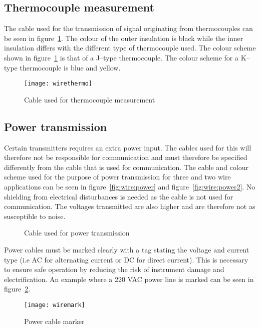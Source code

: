 \subsection{Thermocouple measurement}
The cable used for the transmission of signal originating from thermocouples can be seen in figure~\ref{fig:wire:thermo}. The colour of the outer insulation is black while the inner insulation differs with the different type of thermocouple used. The colour scheme shown in figure~\ref{fig:wire:thermo} is that of a J--type thermocouple. The colour scheme for a K--type thermocouple is blue and yellow.
\begin{figure}[htbp]
	\centering
	\texttt{[image: wirethermo]}
	\caption{Cable used for thermocouple measurement}
	\label{fig:wire:thermo}
\end{figure}

\subsection{Power transmission}
Certain transmitters requires an extra power input. The cables used for this will therefore not be responsible for communication and must therefore be specified differently from the cable that is used for communication. The cable and colour scheme used for the purpose of power transmission for three  and two wire applications can be seen in figure~\ref{fig:wire:power} and figure~\ref{fig:wire:power2}. No shielding from electrical disturbances is needed as the cable is not used for communication. The voltages transmitted are also higher and are therefore not as susceptible to noise.
\begin{figure}[htbp]
  \centering
 	\caption{Cable used for power transmission}
\end{figure}     

Power cables must be marked clearly with a tag stating the voltage and current type (i.e AC for alternating current or DC for direct current). This is necessary to ensure safe operation by reducing the risk of instrument damage and electrification. An example where a 220 VAC power line is marked can be seen in figure~\ref{fig:wire:mark}.
\begin{figure}[htbp]
	\centering
	\texttt{[image: wiremark]}
	\caption{Power cable marker}
	\label{fig:wire:mark}
\end{figure}

